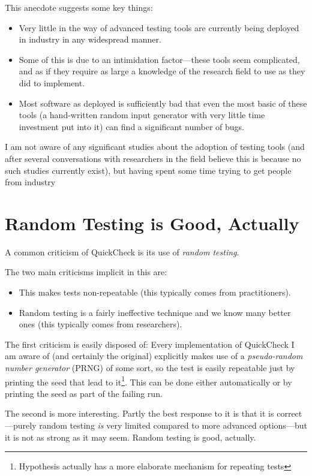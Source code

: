 This anecdote suggests some key things:

\begin{itemize}
\item Very little in the way of advanced testing tools are currently being deployed in industry in any widespread manner.
\item Some of this is due to an intimidation factor---these tools seem complicated,
and as if they require as large a knowledge of the research field to use as they did to implement.
\item Most software as deployed is sufficiently bad that even the most basic of these tools (a hand-written random input generator with very little time investment put into it) can find a significant number of bugs.
\end{itemize}

I am not aware of any significant studies about the adoption of testing tools (and after several conversations with researchers in the field believe this is because no such studies currently exist),
but having spent some time trying to get people from industry 

\chapter{Random Testing is Good, Actually}

A common criticism of QuickCheck is its use of \emph{random testing}.

The two main criticisms implicit in this are:

\begin{itemize}
\item This makes tests non-repeatable (this typically comes from practitioners).
\item Random testing is a fairly ineffective technique and we know many better ones (this typically comes from researchers).
\end{itemize}

The first criticism is easily disposed of:
Every implementation of QuickCheck I am aware of (and certainly the original) explicitly makes use of a \emph{pseudo-random number generator} (PRNG) of some sort,
so the test is easily repeatable just by printing the seed that lead to it\footnote{Hypothesis actually has a more elaborate mechanism for repeating tests}.
This can be done either automatically or by printing the seed as part of the failing run.

The second is more interesting.
Partly the best response to it is that it is correct---purely
random testing \emph{is} very limited compared to more advanced options---but
it is not as strong as it may seem.
Random testing is good, actually.


